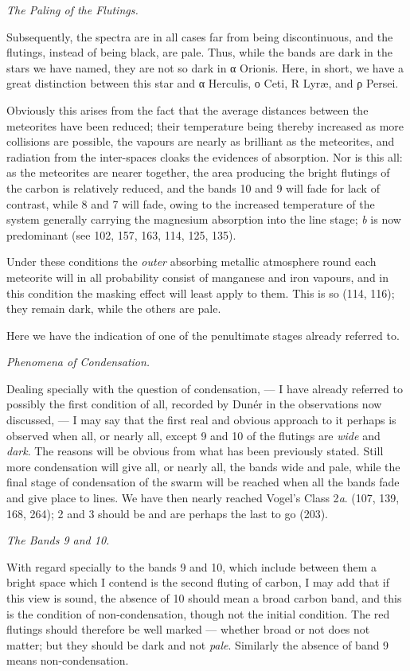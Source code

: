 \documentclass[a4paper, 12pt, oneside, polutonikogreek, english]{article}
\begin{document}
\emph{The Paling of the Flutings.}

Subsequently, the spectra are in all cases far from being discontinuous, and the flutings, instead of being black, are pale. Thus, while the bands are dark in the stars we have named, they are not so dark in α Orionis. Here, in short, we have a great distinction between this star and α Herculis, ο Ceti, R Lyræ, and ρ Persei.

Obviously this arises from the fact that the average distances between the meteorites have been reduced; their temperature being thereby increased as more collisions are possible, the vapours are nearly as brilliant as the meteorites, and radiation from the inter-spaces cloaks the evidences of absorption. Nor is this all: as the meteorites are nearer together, the area producing the bright flutings of the carbon is relatively reduced, and the bands 10 and 9 will fade for lack of contrast, while 8 and 7 will fade, owing to the increased temperature of the system generally carrying the magnesium absorption into the line stage; \emph{b} is now predominant (see 102, 157, 163, 114, 125, 135).

Under these conditions the \emph{outer} absorbing metallic atmosphere round each meteorite will in all probability consist of manganese and iron vapours, and in this condition the masking effect will least apply to them. This is so (114, 116); they remain dark, while the others are pale.

Here we have the indication of one of the penultimate stages already referred to.

\emph{Phenomena of Condensation.}

Dealing specially with the question of condensation, --- I have already referred to possibly the first condition of all, recorded by Dunér in the observations now discussed, --- I may say that the first real and obvious approach to it perhaps is observed when all, or nearly all, except 9 and 10 of the flutings are \emph{wide} and \emph{dark}. The reasons will be obvious from what has been previously stated. Still more condensation will give all, or nearly all, the bands wide and pale, while the final stage of condensation of the swarm will be reached when all the bands fade and give place to lines. We have then nearly reached Vogel's Class 2\emph{a}. (107, 139, 168, 264); 2 and 3 should be and are perhaps the last to go (203).

\emph{The Bands 9 and 10.}

With regard specially to the bands 9 and 10, which include between them a bright space which I contend is the second fluting of carbon, I may add that if this view is sound, the absence of 10 should mean a broad carbon band, and this is the condition of non-condensation, though not the initial condition. The red flutings should therefore be well marked --- whether broad or not does not matter; but they should be dark and not \emph{pale}. Similarly the absence of band 9 means non-condensation.
\end{document}
